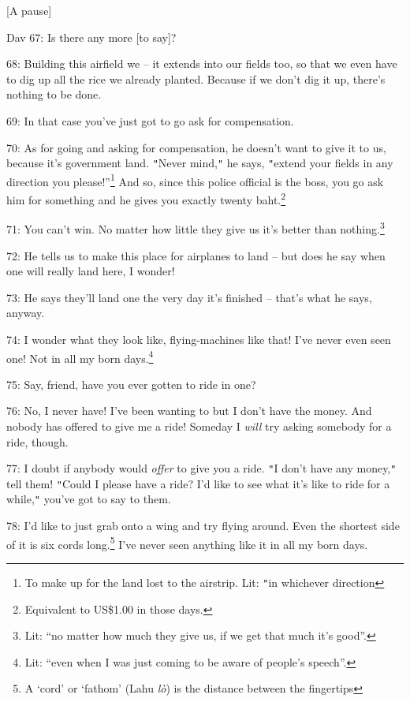 \begin{center}
[A pause]
\end{center}

\leftskip=0pt
Dav 67: Is there any more [to say]?

68: Building this airfield we -- it extends into our fields too, so that we even
have to dig up all the rice we already planted. Because if we don't dig it up,
there's nothing to be done.

69: In that case you've just got to go ask for compensation.

70: As for going and asking for compensation, he doesn't want to give it to us,
because it's government land. \texttt{"}Never mind,\texttt{"} he says, \texttt{"}extend
your fields in any direction you please!''\footnote{To make up for the land lost to the airstrip. Lit: \texttt{"}in whichever direction} And so, since this police official
is the boss, you go ask him for something and he gives you exactly twenty baht.\footnote{Equivalent to US\$1.00 in those days.}

71: You can't win. No matter how little they give us it's better than nothing.\footnote{Lit: ``no matter how much they give us, if we get that much it's good''.}

72: He tells us to make this place for airplanes to land -- but does he say when
one will really land here, I wonder!

73: He says they'll land one the very day it's finished -- that's what he says,
anyway.

74: I wonder what they look like, flying-machines like that! I've never even seen
one! Not in all my born days.\footnote{Lit: ``even when I was just coming to be aware of people's speech''.}

75: Say, friend, have you ever gotten to ride in one?

76: No, I never have! I've been wanting to but I don't have the money. And nobody
has offered to give me a ride! Someday I \textit{will} try asking somebody for
a ride, though.

77: I doubt if anybody would \textit{offer} to give you a ride. \texttt{"}I don't
have any money,\texttt{"} tell them! \texttt{"}Could I please have a ride? I'd
like to see what it's like to ride for a while,\texttt{"} you've got to say to
them.

78: I'd like to just grab onto a wing and try flying around. Even the shortest
side of it is six cords long.\footnote{A `cord' or `fathom' (Lahu \textit{lò}) is the distance between the fingertips} I've never seen anything like it in all my born
days.

